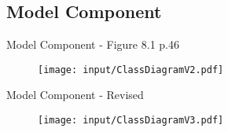 \subsection{Model Component}
\begin{frame}{Model Component - Figure 8.1 p.46}
	
	\begin{figure}[p]%
	\texttt{[image: input/ClassDiagramV2.pdf]}%
	\end{figure}
	
\end{frame}

\begin{frame}{Model Component - Revised}
	
	\begin{figure}[p]%
	\texttt{[image: input/ClassDiagramV3.pdf]}%
	\end{figure}
	
\end{frame}

